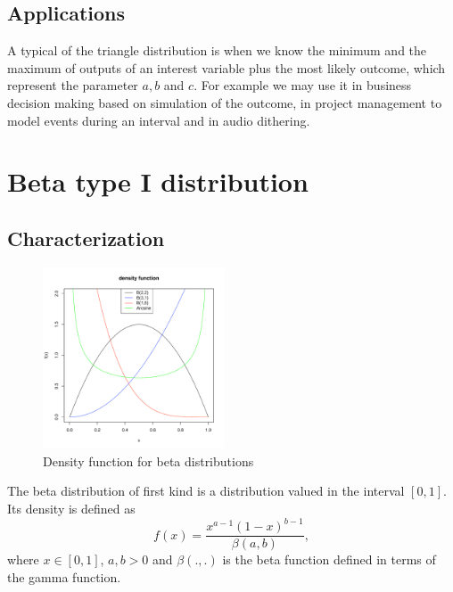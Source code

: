 \subsection{Applications}
A typical of the triangle distribution is when we know the minimum and the maximum of outputs of an interest variable plus the most likely outcome, which represent the parameter $a, b$ and $c$. For example we may use it in business decision making based on simulation of the outcome, in project management to model events during an interval and in audio dithering.

\section{Beta type I distribution}
\subsection{Characterization}
\begin{figure}
  \vspace{-20pt}
  \begin{center}
    \includegraphics[width=0.48\textwidth]{img/betazoom}
  \end{center}
  \vspace{-20pt}  
  \caption{Density function for beta distributions}
\end{figure}
The beta distribution of first kind is a distribution valued in the interval $[0,1]$. Its density is defined as
$$
f(x) = \frac{x^{a-1} (1-x)^{b-1} }{\beta(a,b)},
$$
where $x\in [0,1]$, $a,b>0$ and $\beta(.,.)$ is the beta function defined in terms of the gamma function.

